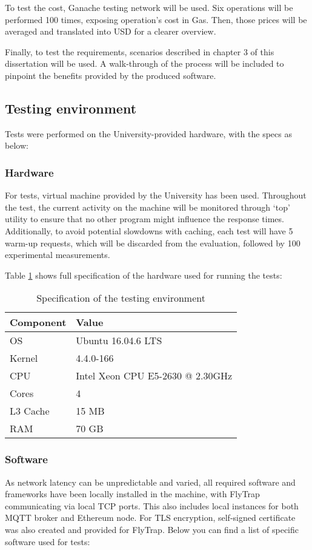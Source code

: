To test the cost, Ganache testing network will be used. Six operations will be performed 100 times, exposing operation's cost in Gas. Then, those prices will be averaged and translated into USD for a clearer overview.

Finally, to test the requirements, scenarios described in chapter 3 of this dissertation will be used. A walk-through of the process will be included to pinpoint the benefits provided by the produced software.
\subsection{Testing environment}
Tests were performed on the University-provided hardware, with the specs as below:
\subsubsection{Hardware}
For tests, virtual machine provided by the University has been used. Throughout the test, the current activity on the machine will be monitored through `top' utility to ensure that no other program might influence the response times. Additionally, to avoid potential slowdowns with caching, each test will have 5 warm-up requests, which will be discarded from the evaluation, followed by 100 experimental measurements.

Table \ref{tab:hw} shows full specification of the hardware used for running the tests:
\begin{table}[]
\centering
\begin{tabular}{|l|l|}
\hline
\textbf{Component} & \textbf{Value}                   \\ \hline
OS                 & Ubuntu 16.04.6 LTS               \\ \hline
Kernel             & 4.4.0-166                        \\ \hline
CPU                & Intel Xeon CPU E5-2630 @ 2.30GHz \\ \hline
Cores              & 4                                \\ \hline
L3 Cache           & 15 MB                            \\ \hline
RAM                & 70 GB                            \\ \hline
\end{tabular}
\caption{Specification of the testing environment}
\label{tab:hw}
\end{table}
\subsubsection{Software}
As network latency can be unpredictable and varied, all required software and frameworks have been locally installed in the machine, with FlyTrap communicating via local TCP ports. This also includes local instances for both MQTT broker and Ethereum node. For TLS encryption, self-signed certificate was also created and provided for FlyTrap. Below you can find a list of specific software used for tests:

